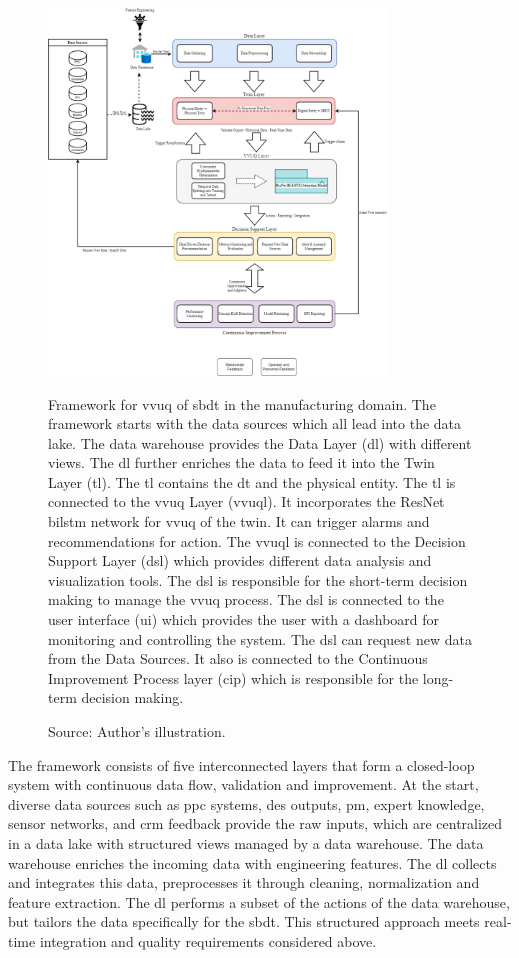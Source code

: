\begin{figure}[htbp]
  \centering
  \includegraphics[width=0.8\textwidth]{figures/framework.png}
  \caption[The thesis VVUQ framework]{Framework for \gls{vvuq} of \gls{sbdt} in the manufacturing domain. The framework starts with the data sources which all lead into the data lake. The data warehouse provides the Data Layer (\gls{dl}) with different views. The \gls{dl} further enriches the data to feed it into the Twin Layer (\gls{tl}). The \gls{tl} contains the \gls{dt} and the physical entity. The \gls{tl} is connected to the \gls{vvuq} Layer (\gls{vvuql}). It incorporates the ResNet \gls{bilstm} network for \gls{vvuq} of the twin. It can trigger alarms and recommendations for action. The \gls{vvuql} is connected to the Decision Support Layer (\gls{dsl}) which provides different data analysis and visualization tools. The \gls{dsl} is responsible for the short-term decision making to manage the \gls{vvuq} process. The \gls{dsl} is connected to the user interface (\gls{ui}) which provides the user with a dashboard for monitoring and controlling the system. The \gls{dsl} can request new data from the Data Sources. It also is connected to the Continuous Improvement Process layer (\gls{cip}) which is responsible for the long-term decision making.}
  \caption*{Source: Author's illustration.}
  \label{fig:framework}
\end{figure}

The framework consists of five interconnected layers that form a closed-loop system with continuous data flow, validation and improvement. At the start, diverse data sources such as \gls{ppc} systems, \gls{des} outputs, \gls{pm}, expert knowledge, sensor networks, and \gls{crm} feedback provide the raw inputs, which are centralized in a data lake with structured views managed by a data warehouse. The data warehouse enriches the incoming data with engineering features. The \gls{dl} collects and integrates this data, preprocesses it through cleaning, normalization and feature extraction. The \gls{dl} performs a subset of the actions of the data warehouse, but tailors the data specifically for the \gls{sbdt}. This structured approach meets real-time integration and quality requirements considered above.

